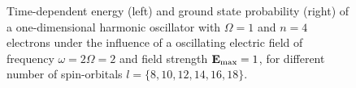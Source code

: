 \begin{figure}[h]
{\begin{minipage}{0.6\textwidth}
    \end{minipage}
    }
    \caption{Time-dependent energy (left) and ground state probability (right)
        of a one-dimensional harmonic oscillator with $\Omega=1$
        and $n=4$ electrons under the influence of a oscillating electric field 
        of frequency $\omega = 2 \Omega = 2$ and field strength $\vb{E}_\text{max}=1$,
        for different number of spin-orbitals $l=\{8,10,12,14,16,18\}$.
    }
    \label{fig:1d_n4_qd}
\end{figure}

\begin{figure}[!h]
    \centering
\end{figure}
